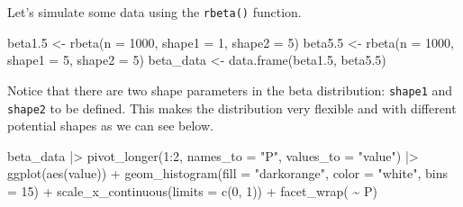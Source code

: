 \documentclass[
  letterpaper,
  DIV=11,
  numbers=noendperiod]{scrreprt}
\newenvironment{Shaded}{\begin{snugshade}}{\end{snugshade}}
\newcommand{\AttributeTok}[1]{\textcolor[rgb]{0.40,0.45,0.13}{#1}}
\newcommand{\DecValTok}[1]{\textcolor[rgb]{0.68,0.00,0.00}{#1}}
\newcommand{\FloatTok}[1]{\textcolor[rgb]{0.68,0.00,0.00}{#1}}
\newcommand{\FunctionTok}[1]{\textcolor[rgb]{0.28,0.35,0.67}{#1}}
\newcommand{\NormalTok}[1]{\textcolor[rgb]{0.00,0.23,0.31}{#1}}
\newcommand{\OtherTok}[1]{\textcolor[rgb]{0.00,0.23,0.31}{#1}}
\newcommand{\SpecialCharTok}[1]{\textcolor[rgb]{0.37,0.37,0.37}{#1}}
\newcommand{\StringTok}[1]{\textcolor[rgb]{0.13,0.47,0.30}{#1}}
\begin{document}
Let's simulate some data using the \texttt{rbeta()} function.

\begin{Shaded}
\begin{Highlighting}[]
\NormalTok{beta1}\FloatTok{.5} \OtherTok{\textless{}{-}} \FunctionTok{rbeta}\NormalTok{(}\AttributeTok{n =} \DecValTok{1000}\NormalTok{, }\AttributeTok{shape1 =} \DecValTok{1}\NormalTok{, }\AttributeTok{shape2 =} \DecValTok{5}\NormalTok{)}
\NormalTok{beta5}\FloatTok{.5} \OtherTok{\textless{}{-}} \FunctionTok{rbeta}\NormalTok{(}\AttributeTok{n =} \DecValTok{1000}\NormalTok{, }\AttributeTok{shape1 =} \DecValTok{5}\NormalTok{, }\AttributeTok{shape2 =} \DecValTok{5}\NormalTok{)}
\NormalTok{beta\_data }\OtherTok{\textless{}{-}} \FunctionTok{data.frame}\NormalTok{(beta1}\FloatTok{.5}\NormalTok{, beta5}\FloatTok{.5}\NormalTok{)}
\end{Highlighting}
\end{Shaded}

Notice that there are two shape parameters in the beta distribution:
\texttt{shape1} and \texttt{shape2} to be defined. This makes the
distribution very flexible and with different potential shapes as we can
see below.

\begin{Shaded}
\begin{Highlighting}[]
\NormalTok{beta\_data }\SpecialCharTok{|\textgreater{}}
  \FunctionTok{pivot\_longer}\NormalTok{(}\DecValTok{1}\SpecialCharTok{:}\DecValTok{2}\NormalTok{, }\AttributeTok{names\_to =} \StringTok{"P"}\NormalTok{,}
               \AttributeTok{values\_to =} \StringTok{"value"}\NormalTok{) }\SpecialCharTok{|\textgreater{}}
  \FunctionTok{ggplot}\NormalTok{(}\FunctionTok{aes}\NormalTok{(value)) }\SpecialCharTok{+}
  \FunctionTok{geom\_histogram}\NormalTok{(}\AttributeTok{fill =} \StringTok{"darkorange"}\NormalTok{,}
                 \AttributeTok{color =} \StringTok{"white"}\NormalTok{,}
                 \AttributeTok{bins =} \DecValTok{15}\NormalTok{) }\SpecialCharTok{+}
  \FunctionTok{scale\_x\_continuous}\NormalTok{(}\AttributeTok{limits =} \FunctionTok{c}\NormalTok{(}\DecValTok{0}\NormalTok{, }\DecValTok{1}\NormalTok{)) }\SpecialCharTok{+}
  \FunctionTok{facet\_wrap}\NormalTok{( }\SpecialCharTok{\textasciitilde{}}\NormalTok{ P) }
\end{Highlighting}
\end{Shaded}
\end{document}
